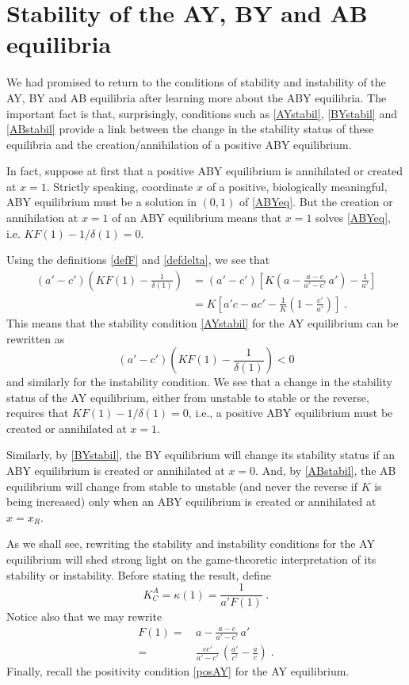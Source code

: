 \documentclass[12pt]{article}
\theoremstyle{definition}
\begin{document}
\section{Stability of the AY, BY and AB equilibria} \label{sec:stabAYBYAB}
We had promised to return to the conditions of stability and instability of the AY, BY and AB equilibria after learning more about the ABY equilibria. The important fact is that, surprisingly,  conditions such as \eqref{AYstabil}, \eqref{BYstabil} and \eqref{ABstabil} provide a link between the change in the stability status of these equilibria and the creation/annihilation of a positive ABY equilibrium.

In fact, suppose at first that a positive ABY equilibrium is annihilated or created at $x=1$. Strictly speaking, coordinate $x$ of a positive, biologically meaningful, ABY equilibrium must be a solution in $(0,1)$ of \eqref{ABYeq}. But the creation or annihilation at $x=1$ of an ABY equilibrium means that $x=1$ solves \eqref{ABYeq}, i.e. $KF(1)-1/\delta(1)=0$.

Using the definitions \eqref{defF} and \eqref{defdelta}, we see that
\begin{align}
	(a'-c')(KF(1)-\frac{1}{\delta(1)})&= (a'-c') \left[K(a-\frac{a-c}{a'-c'}\, a')-\frac{1}{a'} \right]
	\nonumber\\ 
	&= K \left[ a'c-ac'-\frac{1}{K}(1-\frac{c'}{a'})\right]\;.\end{align}
This means that the stability condition \eqref{AYstabil} for the AY equilibrium can be rewritten as
\begin{equation} \label{altAYstab}
	(a'-c') (KF(1)-\frac{1}{\delta(1)}) <0
\end{equation}
and similarly for the instability condition. We see that a change in the stability status of the AY equilibrium, either from unstable to stable or the reverse, requires that $KF(1)-1/\delta(1)=0$, i.e., a positive ABY equilibrium must be created or annihilated at $x=1$. 

Similarly, by \eqref{BYstabil}, the BY equilibrium will change its stability status if an ABY equilibrium is created or annihilated at $x=0$. And, by \eqref{ABstabil}, the AB equilibrium will change from stable to unstable (and never the reverse if $K$ is being increased) only when an ABY equilibrium is created or annihilated at $x=x_R$.

As we shall see, rewriting the stability and instability conditions for the AY equilibrium will shed strong light on the game-theoretic interpretation of its stability or instability. Before stating the result, define
\begin{equation}  \label{defkac}
	K^A_C= \kappa(1)= \frac{1}{a'F(1)}\;.
\end{equation}
Notice also that we may rewrite
\begin{align}
	F(1)= & \,a-\frac{a-c}{a'-c'}\, a' \label{F1<a}\\
	=& \,\frac{c c'}{a'-c'}\, \left(\frac{a'}{c'}- \frac{a}{c}\right)\label{F1>0}\;.
\end{align}
Finally, recall the positivity condition \eqref{posAY} for the AY equilibrium.
\end{document}
